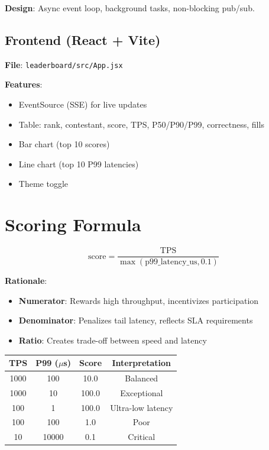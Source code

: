 \documentclass[10pt,a4paper,oneside]{report}
\begin{document}
\textbf{Design}: Async event loop, background tasks, non-blocking pub/sub.

\section{Frontend (React + Vite)}

\textbf{File}: \texttt{leaderboard/src/App.jsx}

\textbf{Features}:
\begin{itemize}
    \item EventSource (SSE) for live updates
    \item Table: rank, contestant, score, TPS, P50/P90/P99, correctness, fills
    \item Bar chart (top 10 scores)
    \item Line chart (top 10 P99 latencies)
    \item Theme toggle
\end{itemize}

\chapter{Scoring Formula}

\begin{equation}
\text{score} = \frac{\text{TPS}}{\max(\text{p99\_latency\_us}, 0.1)}
\end{equation}

\textbf{Rationale}:
\begin{itemize}
    \item \textbf{Numerator}: Rewards high throughput, incentivizes participation
    \item \textbf{Denominator}: Penalizes tail latency, reflects SLA requirements
    \item \textbf{Ratio}: Creates trade-off between speed and latency
\end{itemize}

\begin{table}[H]\small
    \centering
    \begin{tabular}{cccc}
    \toprule
    \textbf{TPS} & \textbf{P99 ($\mu$s)} & \textbf{Score} & \textbf{Interpretation} \\
    \midrule
    1000 & 100 & 10.0 & Balanced \\
    1000 & 10 & 100.0 & Exceptional \\
    100 & 1 & 100.0 & Ultra-low latency \\
    100 & 100 & 1.0 & Poor \\
    10 & 10000 & 0.1 & Critical \\
    \bottomrule
    \end{tabular}
\end{table}
\end{document}

